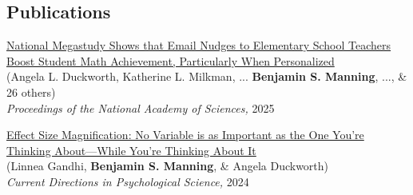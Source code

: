 \documentclass[margin,line,pifont,palatino,courier, 9pt]{res}
\begin{document}
\begin{resume}

\section{\sc Publications}
\href{https://www.pnas.org/doi/10.1073/pnas.2418616122}{National Megastudy Shows that Email Nudges to Elementary School Teachers Boost Student Math Achievement, Particularly When Personalized}\\
(Angela L. Duckworth\footnotemark[\value{footnote}], Katherine L. Milkman, ... \textbf{Benjamin S. Manning}, ..., \& 26 others)\\
\textit{Proceedings of the National Academy of Sciences,} 2025

\href{https://journals.sagepub.com/doi/full/10.1177/09637214241268222}{Effect Size Magnification: No Variable is as Important as the One You're Thinking About---While You're Thinking About It}\\
(Linnea Gandhi\footnotemark[\value{footnote}], \textbf{Benjamin S. Manning}, \& Angela Duckworth)\\
\textit{Current Directions in Psychological Science,} 2024


\end{resume}
\end{document}

